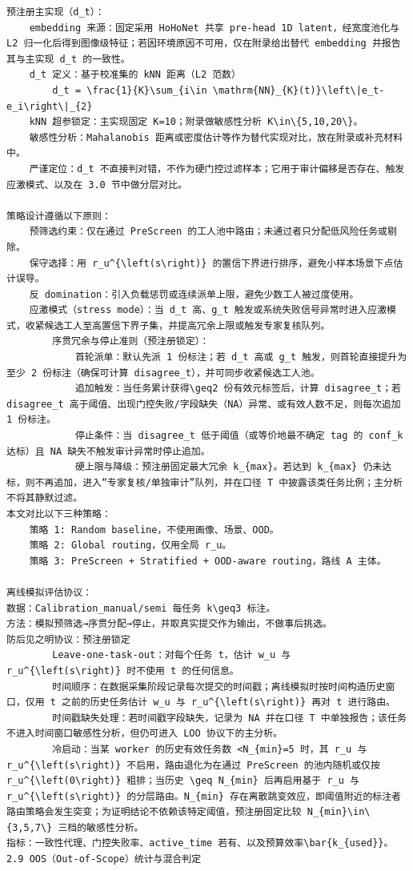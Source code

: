\documentclass[a4paper,12pt]{article}
\begin{document}
\begin{Verbatim}[fontsize=\small,breaklines=true,breakanywhere=true]
预注册主实现（d_t）：
	embedding 来源：固定采用 HoHoNet 共享 pre-head 1D latent，经宽度池化与 L2 归一化后得到图像级特征；若因环境原因不可用，仅在附录给出替代 embedding 并报告其与主实现 d_t 的一致性。
	d_t 定义：基于校准集的 kNN 距离（L2 范数）
		d_t = \frac{1}{K}\sum_{i\in \mathrm{NN}_{K}(t)}\left\|e_t-e_i\right\|_{2}
	kNN 超参锁定：主实现固定 K=10；附录做敏感性分析 K\in\{5,10,20\}。
	敏感性分析：Mahalanobis 距离或密度估计等作为替代实现对比，放在附录或补充材料中。
	严谨定位：d_t 不直接判对错，不作为硬门控过滤样本；它用于审计偏移是否存在、触发应激模式、以及在 3.0 节中做分层对比。

策略设计遵循以下原则：
	预筛选约束：仅在通过 PreScreen 的工人池中路由；未通过者只分配低风险任务或剔除。
	保守选择：用 r_u^{\left(s\right)} 的置信下界进行排序，避免小样本场景下点估计误导。
	反 domination：引入负载惩罚或连续派单上限，避免少数工人被过度使用。
	应激模式（stress mode）：当 d_t 高、g_t 触发或系统失败信号异常时进入应激模式，收紧候选工人至高置信下界子集，并提高冗余上限或触发专家复核队列。
		序贯冗余与停止准则（预注册锁定）：
			首轮派单：默认先派 1 份标注；若 d_t 高或 g_t 触发，则首轮直接提升为至少 2 份标注（确保可计算 disagree_t），并可同步收紧候选工人池。
			追加触发：当任务累计获得\geq2 份有效元标签后，计算 disagree_t；若 disagree_t 高于阈值、出现门控失败/字段缺失（NA）异常、或有效人数不足，则每次追加 1 份标注。
			停止条件：当 disagree_t 低于阈值（或等价地最不确定 tag 的 conf_k 达标）且 NA 缺失不触发审计异常时停止追加。
			硬上限与降级：预注册固定最大冗余 k_{max}。若达到 k_{max} 仍未达标，则不再追加，进入“专家复核/单独审计”队列，并在口径 T 中披露该类任务比例；主分析不将其静默过滤。
本文对比以下三种策略：
	策略 1: Random baseline，不使用画像、场景、OOD。
	策略 2: Global routing，仅用全局 r_u。
	策略 3: PreScreen + Stratified + OOD-aware routing，路线 A 主体。

离线模拟评估协议：
数据：Calibration_manual/semi 每任务 k\geq3 标注。
方法：模拟预筛选→序贯分配→停止，并取真实提交作为输出，不做事后挑选。
防后见之明协议：预注册锁定
		Leave-one-task-out：对每个任务 t，估计 w_u 与 r_u^{\left(s\right)} 时不使用 t 的任何信息。
		时间顺序：在数据采集阶段记录每次提交的时间戳；离线模拟时按时间构造历史窗口，仅用 t 之前的历史任务估计 w_u 与 r_u^{\left(s\right)} 再对 t 进行路由。
		时间戳缺失处理：若时间戳字段缺失，记录为 NA 并在口径 T 中单独报告；该任务不进入时间窗口敏感性分析，但仍可进入 LOO 协议下的主分析。
		冷启动：当某 worker 的历史有效任务数 <N_{min}=5 时，其 r_u 与 r_u^{\left(s\right)} 不启用，路由退化为在通过 PreScreen 的池内随机或仅按 r_u^{\left(0\right)} 粗排；当历史 \geq N_{min} 后再启用基于 r_u 与 r_u^{\left(s\right)} 的分层路由。N_{min} 存在离散跳变效应，即阈值附近的标注者路由策略会发生突变；为证明结论不依赖该特定阈值，预注册固定比较 N_{min}\in\{3,5,7\} 三档的敏感性分析。
指标：一致性代理、门控失败率、active_time 若有、以及预算效率\bar{k_{used}}。
2.9 OOS（Out-of-Scope）统计与混合判定


\end{Verbatim}
\end{document}
